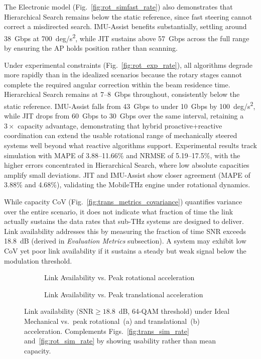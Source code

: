 \documentclass[fleqn,10pt]{wlscirep}
\begin{document}
The Electronic model (Fig.~\ref{fig:rot_simfast_rate}) also demonstrates that Hierarchical Search remains below the static reference, since fast steering cannot correct a misdirected search. IMU-Assist benefits substantially, settling around \SI{38}{Gbps} at \SI{700}{deg/s^2}, while JIT sustains above \SI{57}{Gbps} across the full range by ensuring the AP holds position rather than scanning.

Under experimental constraints (Fig.~\ref{fig:rot_exp_rate}), all algorithms degrade more rapidly than in the idealized scenarios because the rotary stages cannot complete the required angular correction within the beam residence time. Hierarchical Search remains at \SI{7}{}--\SI{8}{Gbps} throughout, consistently below the static reference. IMU-Assist falls from \SI{43}{Gbps} to under \SI{10}{Gbps} by \SI{100}{deg/s^2}, while JIT drops from \SI{60}{Gbps} to \SI{30}{Gbps} over the same interval, retaining a $3\times$ capacity advantage, demonstrating that hybrid proactive+reactive coordination can extend the usable rotational range of mechanically steered systems well beyond what reactive algorithms support. Experimental results track simulation with MAPE of 3.88--11.66\% and NRMSE of 5.19--17.5\%, with the higher errors concentrated in Hierarchical Search, where low absolute capacities amplify small deviations. JIT and IMU-Assist show closer agreement (MAPE of 3.88\% and 4.68\%), validating the MobileTHz engine under rotational dynamics.

While capacity CoV (Fig.~\ref{fig:trans_metrics_covariance}) quantifies variance over the entire scenario, it does not indicate what fraction of time the link actually sustains the data rates that sub-THz systems are designed to deliver\cite{Dang2020, Nokia2022}. Link availability addresses this by measuring the fraction of time SNR exceeds \SI{18.8}{dB} (derived in \textit{Evaluation Metrics} subsection). A system may exhibit low CoV yet poor link availability if it sustains a steady but weak signal below the modulation threshold.

\begin{figure}[h!]
    \centering
    \begin{subfigure}{0.495\linewidth}
        
        \vspace{-25pt}
        \caption{Link Availability vs. Peak rotational acceleration}
        \label{fig:rotionalLinkAvail}
    \end{subfigure}
    \hfill
    \begin{subfigure}{0.495\linewidth}
        
        \vspace{-25pt}
        \caption{Link Availability vs. Peak translational acceleration}
        \label{fig:translationalLinkAvail}
    \end{subfigure}
    \caption{Link availability ($\mathrm{SNR} \geq 18.8$~dB, 64-QAM threshold) under Ideal Mechanical vs.\ peak rotational~(a) and translational~(b) acceleration. Complements Figs.~\ref{fig:trans_sim_rate} and~\ref{fig:rot_sim_rate} by showing usability rather than mean capacity.}
    \label{fig:accelLinkAvail}
    \vspace{-5pt}
\end{figure}
\end{document}
